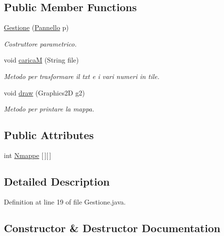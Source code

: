 \subsection*{Public Member Functions}
\begin{DoxyCompactItemize}
\item 
\hyperlink{classblocchi_1_1_gestione_a5bc02f9cbad6e4f5c1a061b599a9f5da}{Gestione} (\hyperlink{classa_1_1survival_1_1game_1_1_pannello}{Pannello} p)
\begin{DoxyCompactList}\small\item\em Costruttore parametrico. \end{DoxyCompactList}\item 
void \hyperlink{classblocchi_1_1_gestione_a373d83d9b42d31e72ccc982a3fd85ea9}{caricaM} (String file)
\begin{DoxyCompactList}\small\item\em Metodo per trasformare il txt e i vari numeri in tile. \end{DoxyCompactList}\item 
void \hyperlink{classblocchi_1_1_gestione_ae8c972c0fb4fcbc09c2219dd32cbd053}{draw} (Graphics2D g2)
\begin{DoxyCompactList}\small\item\em Metodo per printare la mappa. \end{DoxyCompactList}\end{DoxyCompactItemize}
\subsection*{Public Attributes}
\begin{DoxyCompactItemize}
\item 
int \hyperlink{classblocchi_1_1_gestione_ac67a253aa050f8b036b79e9613b946e9}{Nmappe} \mbox{[}$\,$\mbox{]}\mbox{[}$\,$\mbox{]}
\end{DoxyCompactItemize}


\subsection{Detailed Description}


Definition at line 19 of file Gestione.\+java.



\subsection{Constructor \& Destructor Documentation}
\mbox{\label{classblocchi_1_1_gestione_a5bc02f9cbad6e4f5c1a061b599a9f5da}} 

